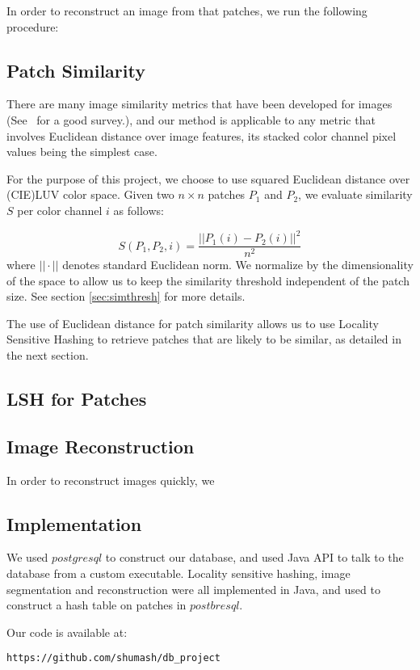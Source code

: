 In order to reconstruct an image from that patches, we run the following
procedure:



\subsection{Patch Similarity}\label{ssec:sim}
There are many image similarity metrics that have been developed for
images (See~\cite{yasmin2013use} for a good survey.), and
our method is applicable to any metric that involves Euclidean
distance over image features, its stacked color channel pixel values
being the simplest case.

For the purpose of this project, we choose to use squared Euclidean
distance over (CIE)LUV color space.
Given two $n \times n$ patches $P_1$ and $P_2$, we evaluate similarity $S$
per color channel $i$ as follows:

\begin{displaymath}
S(P_1, P_2, i) = \frac{||P_1(i) - P_2(i)||^2}{n^2}
\end{displaymath}
where $||\cdot||$ denotes standard Euclidean norm.
We normalize by the dimensionality of the space to allow us to keep the
similarity threshold independent of the patch size. See section \ref{sec:simthresh} for more details.

The use of Euclidean distance for patch similarity
allows us to use Locality Sensitive Hashing to retrieve patches
that are likely to be similar, as detailed in the
next section.

\subsection{LSH for Patches}\label{ssec:lsh}

\subsection{Image Reconstruction}\label{ssec:reconst}

In order to reconstruct images quickly, we

\subsection{Implementation}\label{ssec:impl}
We used $postgresql$ to construct our database, and used
Java API to talk to the database from a custom executable. Locality
sensitive hashing, image segmentation and reconstruction were
all implemented in Java, and used to construct a hash table
on patches in $postbresql$.

Our code is available at:
\begin{verbatim}
https://github.com/shumash/db_project
\end{verbatim}
